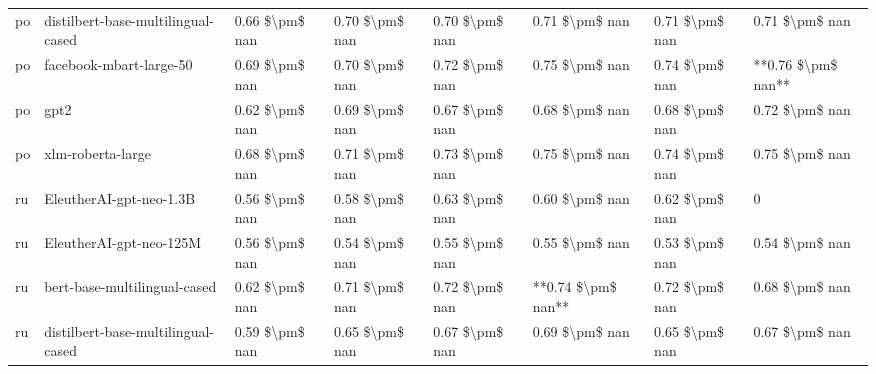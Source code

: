 \begin{tabular}{llllllll}
      po & distilbert-base-multilingual-cased & 0.66 \$\textbackslash pm\$ nan &            0.70 \$\textbackslash pm\$ nan &        0.70 \$\textbackslash pm\$ nan &         0.71 \$\textbackslash pm\$ nan &                          0.71 \$\textbackslash pm\$ nan &     0.71 \$\textbackslash pm\$ nan \\
      po &            facebook-mbart-large-50 & 0.69 \$\textbackslash pm\$ nan &            0.70 \$\textbackslash pm\$ nan &        0.72 \$\textbackslash pm\$ nan &         0.75 \$\textbackslash pm\$ nan &                          0.74 \$\textbackslash pm\$ nan & **0.76 \$\textbackslash pm\$ nan** \\
      po &                               gpt2 & 0.62 \$\textbackslash pm\$ nan &            0.69 \$\textbackslash pm\$ nan &        0.67 \$\textbackslash pm\$ nan &         0.68 \$\textbackslash pm\$ nan &                          0.68 \$\textbackslash pm\$ nan &     0.72 \$\textbackslash pm\$ nan \\
      po &                  xlm-roberta-large & 0.68 \$\textbackslash pm\$ nan &            0.71 \$\textbackslash pm\$ nan &        0.73 \$\textbackslash pm\$ nan &         0.75 \$\textbackslash pm\$ nan &                          0.74 \$\textbackslash pm\$ nan &     0.75 \$\textbackslash pm\$ nan \\
      ru &            EleutherAI-gpt-neo-1.3B & 0.56 \$\textbackslash pm\$ nan &            0.58 \$\textbackslash pm\$ nan &        0.63 \$\textbackslash pm\$ nan &         0.60 \$\textbackslash pm\$ nan &                          0.62 \$\textbackslash pm\$ nan &                  0 \\
      ru &            EleutherAI-gpt-neo-125M & 0.56 \$\textbackslash pm\$ nan &            0.54 \$\textbackslash pm\$ nan &        0.55 \$\textbackslash pm\$ nan &         0.55 \$\textbackslash pm\$ nan &                          0.53 \$\textbackslash pm\$ nan &     0.54 \$\textbackslash pm\$ nan \\
      ru &       bert-base-multilingual-cased & 0.62 \$\textbackslash pm\$ nan &            0.71 \$\textbackslash pm\$ nan &        0.72 \$\textbackslash pm\$ nan &     **0.74 \$\textbackslash pm\$ nan** &                          0.72 \$\textbackslash pm\$ nan &     0.68 \$\textbackslash pm\$ nan \\
      ru & distilbert-base-multilingual-cased & 0.59 \$\textbackslash pm\$ nan &            0.65 \$\textbackslash pm\$ nan &        0.67 \$\textbackslash pm\$ nan &         0.69 \$\textbackslash pm\$ nan &                          0.65 \$\textbackslash pm\$ nan &     0.67 \$\textbackslash pm\$ nan \\

\end{tabular}
